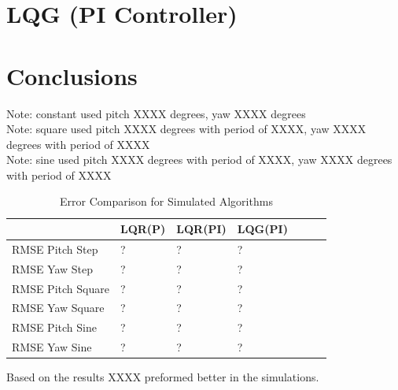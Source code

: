 \section{LQG (PI Controller)}

\section{Conclusions}
Note: constant used pitch XXXX degrees, yaw XXXX degrees\\
Note: square used pitch XXXX degrees with period of XXXX, yaw XXXX degrees with period of XXXX\\
Note: sine used pitch XXXX degrees with period of XXXX, yaw XXXX degrees with period of XXXX\\
\begin{table}[!htbp]
    \centering
    \begin{tabular}{l|l|l|l|l|l|l}
        \toprule
        \textbf{} & \textbf{LQR(P)} & \textbf{LQR(PI)} & \textbf{LQG(PI)} \\
        \toprule
        RMSE Pitch Step & ? & ? & ?  \\
        RMSE Yaw Step & ? & ? & ? \\
        RMSE Pitch Square & ? & ? & ? \\
        RMSE Yaw Square & ? & ? & ? \\
        RMSE Pitch Sine & ? & ? & ? \\
        RMSE Yaw Sine & ? & ? & ? \\
        \bottomrule
    \end{tabular}
    \caption{Error Comparison for Simulated Algorithms}
    \label{tab:Simulate_RMSE}
\end{table}
Based on the results XXXX preformed better in the simulations.



